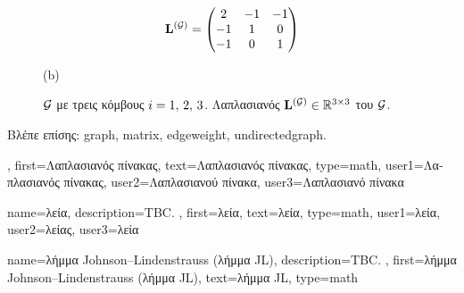 {{\begin{figure}[H]
\begin{center}
\begin{minipage}{0.45\textwidth}
	 	\end{minipage} 
	 	\hspace*{-15mm}
 		\begin{minipage}{0.45\textwidth}
		\centering
	 		\begin{equation} 
	 			{\bf L}^{(\mathcal{G})} = \begin{pmatrix} 2 & -1& -1 \\ -1& 1 & 0 \\  -1 & 0 & 1 \end{pmatrix}  
	 			\nonumber
	 		\end{equation} 
			\begin{minipage}{\textwidth}
				\vspace{3.5ex}
				\centering
				{\selectfont (b)}
			\end{minipage}
	 	\end{minipage}
		{
	 	\caption{\label{fig_lap_mtx_dict}   $\mathcal{G}$ 
		 	\foreignlanguage{greek}{με τρεις κόμβους $i=1,\,2,\,3$.}  \foreignlanguage{greek}{Λαπλασιανός} 
			 ${\bf L}^{(\mathcal{G})}  \in \mathbb{R}^{3 \times 3}$ \foreignlanguage{greek}{του} $\mathcal{G}$.} }
	 	\end{center}
	 	\end{figure}
		\foreignlanguage{greek}{Βλέπε επίσης:} \gls{graph}, \gls{matrix}, \gls{edgeweight}, \gls{undirectedgraph}.},
	first={\foreignlanguage{greek}{Λαπλασιανός πίνακας}},
	text={\foreignlanguage{greek}{Λαπλασιανός πίνακας}},
	type=math,
	user1={\foreignlanguage{greek}{Λαπλασιανός πίνακας}}, %
  	user2={\foreignlanguage{greek}{Λαπλασιανού πίνακα}}, %
	user3={\foreignlanguage{greek}{Λαπλασιανό πίνακα}} %
}

{name={\foreignlanguage{greek}{λεία}},
	description={TBC. },
	first={\foreignlanguage{greek}{λεία}},
	text={\foreignlanguage{greek}{λεία}},
	type=math,
	user1={\foreignlanguage{greek}{λεία}}, %
	user2={\foreignlanguage{greek}{λείας}}, %
	user3={\foreignlanguage{greek}{λεία}} %
}

{name={\foreignlanguage{greek}{λήμμα} Johnson--Lindenstrauss (\foreignlanguage{greek}{λήμμα} JL)},
	description={TBC. },	
	first={\foreignlanguage{greek}{λήμμα} Johnson--Lindenstrauss (\foreignlanguage{greek}{λήμμα} JL)},
  	text={\foreignlanguage{greek}{λήμμα} JL},
	type=math
}

